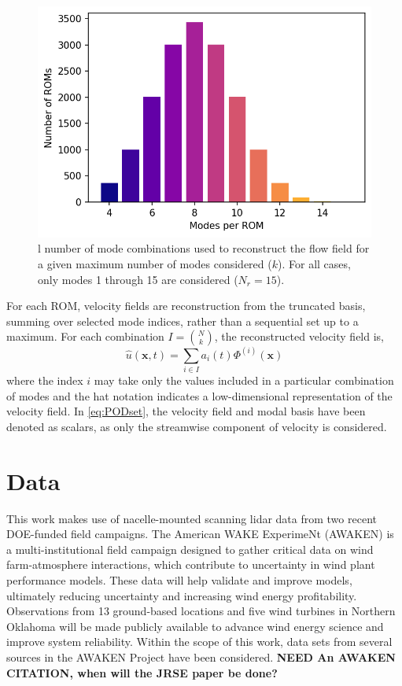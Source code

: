 \documentclass[%
 aip,
 amsmath,
 amssymb,
preprint,%
]{revtex4-2}
\begin{document}
\begin{figure}[h]
    \centering
    \includegraphics[width=0.5\linewidth]{figs/caseCounts_20240828.png}
    \caption{l number of mode combinations used to reconstruct the flow field for a given maximum number of modes considered ($k$). For all cases, only modes 1 through 15 are considered ($N_r=15$).}
    \label{fig:caseCounts_20240828}
\end{figure}

For each ROM, velocity fields are reconstruction from the truncated basis, summing over selected mode indices, rather than a sequential set up to a maximum. 
For each combination $I=\binom{N}{k}$, the reconstructed velocity field is,
\begin{equation}
  \hat{u}(\bm{x},t) = \sum_{i \in I} a_i(t) \Phi^{(i)} (\bm{x})
  \label{eq:PODset}
\end{equation}
where the index $i$ may take only the values included in a particular combination of modes and the hat notation indicates a low-dimensional representation of the velocity field. 
In \cref{eq:PODset}, the velocity field and modal basis have been denoted as scalars, as only the streamwise component of velocity is considered. 

\section{Data} %
\label{sec:Data}

This work makes use of nacelle-mounted scanning lidar data from two recent DOE-funded field campaigns.
The American WAKE ExperimeNt (AWAKEN\cite{moriarty2020american}) is a multi-institutional field campaign designed to gather critical data on wind farm-atmosphere interactions, which contribute to uncertainty in wind plant performance models. These data will help validate and improve models, ultimately reducing uncertainty and increasing wind energy profitability. Observations from 13 ground-based locations and five wind turbines in Northern Oklahoma will be made publicly available to advance wind energy science and improve system reliability.
Within the scope of this work, data sets from several sources in the AWAKEN Project have been considered.
\textbf{NEED An AWAKEN CITATION, when will the JRSE paper be done?}
\end{document}
